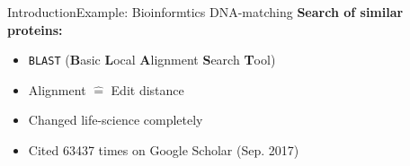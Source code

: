 
\begin{frame}{Introduction}{Example: Bioinformtics DNA-matching}
  \textbf{Search of similar proteins:}
  \begin{itemize}
    \item<2->
      \texttt{BLAST} (\textbf{B}asic \textbf{L}ocal \textbf{A}lignment
        \textbf{S}earch \textbf{T}ool)
    \item<3->
      Alignment $\hat{=}$ Edit distance
    \item<4->
      Changed life-science completely
    \item<5->
      Cited 63437 times on Google Scholar (Sep. 2017)

  \end{itemize}

\end{frame}

